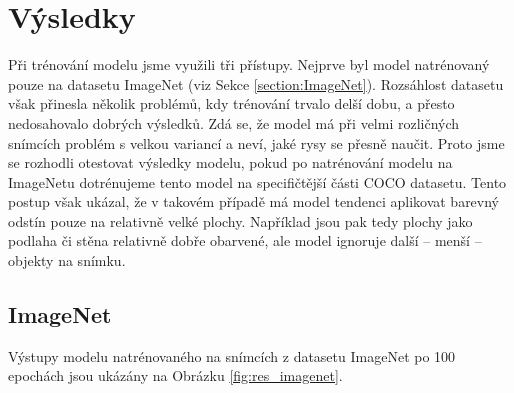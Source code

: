 \documentclass[12pt, a4paper]{article}
\begin{document}
    \section{Výsledky}
    Při trénování modelu jsme využili tři přístupy. Nejprve byl model natrénovaný pouze na datasetu ImageNet (viz Sekce \ref{section:ImageNet}). Rozsáhlost datasetu však přinesla několik problémů, kdy trénování trvalo delší dobu, a přesto nedosahovalo dobrých výsledků. Zdá se, že model má při velmi rozličných snímcích problém s velkou variancí a neví, jaké rysy se přesně naučit. Proto jsme se rozhodli otestovat výsledky modelu, pokud po natrénování modelu na ImageNetu dotrénujeme tento model na specifičtější části COCO datasetu. Tento postup však ukázal, že v takovém případě má model tendenci aplikovat barevný odstín pouze na relativně velké plochy. Například jsou pak tedy plochy jako podlaha či stěna relativně dobře obarvené, ale model ignoruje další -- menší -- objekty na snímku.
    
    \subsection{ImageNet}\label{results:imagenet}
    Výstupy modelu natrénovaného na snímcích z datasetu ImageNet po 100 epochách jsou ukázány na Obrázku \ref{fig:res_imagenet}.
    
\end{document}
